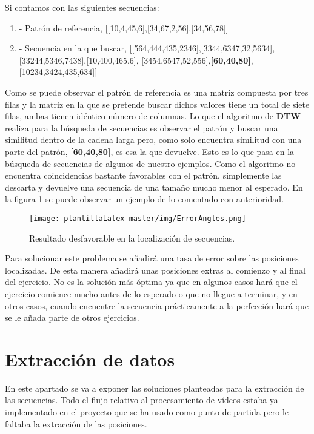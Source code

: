 Si contamos con las siguientes secuencias:
\begin{enumerate}
    \item - Patrón de referencia, [[10,4,45,6],[34,67,2,56],[34,56,78]]
    \item - Secuencia en la que buscar, [[564,444,435,2346],[3344,6347,32,5634], [33244,5346,7438],[10,400,465,6], [3454,6547,52,556],\textbf{[60,40,80]}, [10234,3424,435,634]]
\end{enumerate}

Como se puede observar el patrón de referencia es una matriz compuesta por tres filas y la matriz en la que se pretende buscar dichos valores tiene un total de siete filas, ambas tienen idéntico número de columnas. Lo que el algoritmo de \textbf{DTW} realiza para la búsqueda de secuencias es observar el patrón y buscar una similitud dentro de la cadena larga pero, como solo encuentra similitud con una parte del patrón, \textbf{[60,40,80]}, es esa la que devuelve.
Esto es lo que pasa en la búsqueda de secuencias de algunos de nuestro ejemplos. Como el algoritmo no encuentra coincidencias bastante favorables con el patrón, simplemente las descarta y devuelve una secuencia de una tamaño mucho menor al esperado. En la figura \ref{fig:ErrorAngles} se puede observar un ejemplo de lo comentado con anterioridad. 

\begin{figure}[H]
    \centering
    \texttt{[image: plantillaLatex-master/img/ErrorAngles.png]}
    \caption{Resultado desfavorable en la localización de secuencias.}
    \label{fig:ErrorAngles}
\end{figure}

Para solucionar este problema se añadirá una tasa de error sobre las posiciones localizadas. De esta manera añadirá unas posiciones extras al comienzo y al final del ejercicio. No es la solución más óptima ya que en algunos casos hará que el ejercicio comience mucho antes de lo esperado o que no llegue a terminar, y en otros casos, cuando encuentre la secuencia prácticamente a la perfección hará que se le añada parte de otros ejercicios. 


\section{Extracción de datos}

En este apartado se va a exponer las soluciones planteadas para la extracción de las secuencias. Todo el flujo relativo al procesamiento de vídeos estaba ya implementado en el proyecto que se ha usado como punto de partida pero le faltaba la extracción de las posiciones. 

